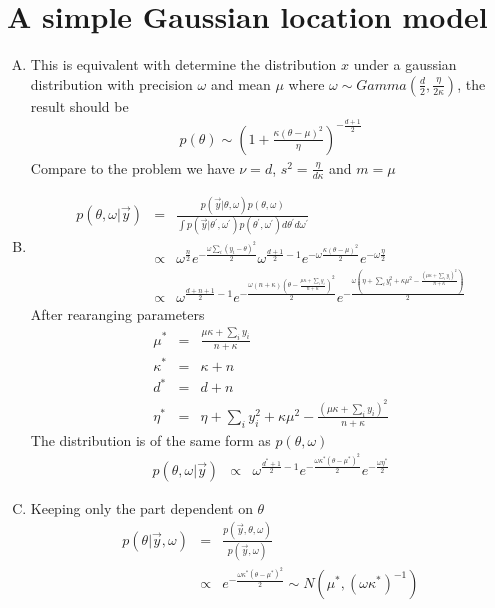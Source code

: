 \documentclass{article}
\begin{document}
\section{A simple Gaussian location model}
\begin{enumerate}[(A)]
\item
This is equivalent with determine the distribution $x$ under a gaussian distribution with precision $\omega$ and mean $\mu$ where $\omega\sim Gamma(\frac{d}{2},\frac{\eta}{2\kappa})$, the result should be
\begin{eqnarray}
p(\theta)\sim(1+\frac{\kappa(\theta-\mu)^2}{\eta})^{-\frac{d+1}{2}}
\end{eqnarray}
Compare to the problem we have $\nu=d$, $s^2=\frac{\eta}{d\kappa}$ and $m=\mu$
\item
\begin{eqnarray}
p(\theta,\omega|\vec{y})&=&\frac{p(\vec{y}|\theta,\omega)p(\theta,\omega)}{\int p(\vec{y}|\theta^\prime,\omega^\prime)p(\theta^\prime,\omega^\prime)d\theta^\prime d\omega^\prime}\nonumber\\
&\propto&\omega^{\frac{n}{2}}e^{-\frac{\omega\sum_i(y_i-\theta)^2}{2}}\omega^{\frac{d+1}{2}-1}e^{-\omega\frac{\kappa(\theta-\mu)^2}{2}}e^{-\omega\frac{\eta}{2}}\nonumber\\
&\propto&\omega^{\frac{d+n+1}{2}-1}e^{-\frac{\omega(n+\kappa)(\theta-\frac{\mu\kappa+\sum_iy_i}{n+\kappa})^2}{2}}e^{-\frac{\omega(\eta+\sum_iy_i^2+\kappa\mu^2-\frac{(\mu\kappa+\sum_iy_i)^2}{n+\kappa})}{2}}
\end{eqnarray}
After rearanging parameters
\begin{eqnarray}
\mu^*&=&\frac{\mu\kappa+\sum_iy_i}{n+\kappa}\\
\kappa^*&=&\kappa+n\\
d^*&=&d+n\\
\eta^*&=&\eta+\sum_iy_i^2+\kappa\mu^2-\frac{(\mu\kappa+\sum_iy_i)^2}{n+\kappa}
\end{eqnarray}
The distribution is of the same form as $p(\theta,\omega)$
\begin{eqnarray}
p(\theta,\omega|\vec{y})&\propto&\omega^{\frac{d^*+1}{2}-1}e^{-\frac{\omega\kappa^*(\theta-\mu^*)^2}{2}}e^{-\frac{\omega\eta^*}{2}}
\end{eqnarray}
\item
Keeping only the part dependent on $\theta$
\begin{eqnarray}
p(\theta|\vec{y},\omega)&=&\frac{p(\vec{y},\theta,\omega)}{p(\vec{y},\omega)}\nonumber\\
&\propto&e^{-\frac{\omega\kappa^*(\theta-\mu^*)^2}{2}}\sim N(\mu^*,(\omega\kappa^*)^{-1})

\end{eqnarray}
\end{enumerate}
\end{document}
